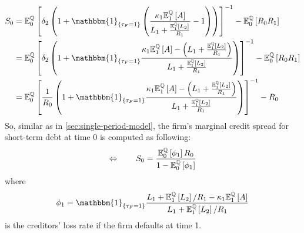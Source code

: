 \documentclass[main.tex]{subfiles}
\begin{document}
        \begin{align}
            S_0 &=
            \mathbb{E}_{0}^{\rnmeasure}\left[
                \delta_2\left(
                    1
                    + \mathbbm{1}_{\{\tau_{F} = 1\}}\left(
                        \frac{\kappa_1 \mathbb{E}_{1}^{\rnmeasure}\left[A\right]}{L_1 + \frac{\mathbb{E}_{1}^{\rnmeasure}\left[L_2\right]}{R_1}} - 1
                    \right)
                \right)
            \right]^{-1} - \mathbb{E}_{0}^{\rnmeasure}\left[R_0 R_1\right]
            \nonumber
            \\
            &=
            \mathbb{E}_{0}^{\rnmeasure}\left[
                \delta_2 \left(
                    1
                    + \mathbbm{1}_{\{\tau_{F} = 1\}}
                    \frac{
                        \kappa_1 \mathbb{E}_{1}^{\rnmeasure}\left[A\right] - \left(L_1 + \frac{\mathbb{E}_{1}^{\rnmeasure}\left[L_2\right]}{R_1}\right)
                    }{
                        L_1 + \frac{\mathbb{E}_{1}^{\rnmeasure}\left[L_2\right]}{R_1}
                    }
                \right)
            \right]^{-1} - \mathbb{E}_{0}^{\rnmeasure}\left[R_0 R_1\right]
            \nonumber
            \\
            &=
            \mathbb{E}_{0}^{\rnmeasure}\left[
                \frac{1}{R_0} \left(
                    1
                    + \mathbbm{1}_{\{\tau_{F} = 1\}}
                    \frac{
                        \kappa_1 \mathbb{E}_{1}^{\rnmeasure}\left[A\right] - \left(L_1 + \frac{\mathbb{E}_{1}^{\rnmeasure}\left[L_2\right]}{R_1}\right)
                    }{
                        L_1 + \frac{\mathbb{E}_{1}^{\rnmeasure}\left[L_2\right]}{R_1}
                    }
                \right)
            \right]^{-1} - R_0
            \nonumber
        \end{align}
        So, similar as in \cref{sec:single-period-model}, the firm's marginal credit spread for short-term debt at time 0 is computed as following:
        \begin{equation}
            \Leftrightarrow \qquad
            S_0 =
            \frac{
                \mathbb{E}_{0}^{\mathbb{Q}}\left[\phi_1\right]R_0
            }{
                1 - \mathbb{E}_{0}^{\mathbb{Q}}\left[\phi_1\right] 
            }
        \end{equation}
        where
        \begin{equation}
            \phi_1 =
            \mathbbm{1}_{\{\tau_{F}=1\}}
            \frac{
                L_{1}+\mathbb{E}_{1}^{\rnmeasure}\left[L_{2}\right]/R_1 - \kappa_{1}\mathbb{E}_{1}^{\rnmeasure}\left[A\right]
            }{
                L_{1} + \mathbb{E}_{1}^{\rnmeasure}\left[L_{2}\right]/R_1
            }
        \end{equation}
        is the creditors' loss rate if the firm defaults at time 1.
        
\end{document}
